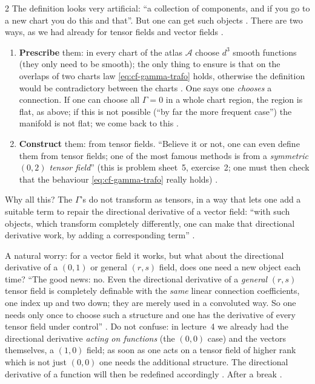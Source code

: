 \begin{paracol}{2}
The definition looks very artificial: ``a collection of components, and if you go to a new chart you do this and that''. But one
can get such objects . There are two ways, as we had already for tensor fields and vector fields
.
\begin{enumerate}
  \item \textbf{Prescribe} them: in every chart of the atlas $\mathcal A$ choose $d^3$ smooth functions (they only need to be
        smooth); the only thing to ensure is that on the overlaps of two charts law \eqref{eq:cf-gamma-trafo} holds, otherwise the definition would
        be contradictory between the charts . One says one \emph{chooses} a connection. If one can choose all
        $\Gamma=0$ in a whole chart region, the region is flat, as above; if this is not possible (``by far the more frequent
        case'') the manifold is not flat; we come back to this .
  \item \textbf{Construct} them: from tensor fields. ``Believe it or not, one can even define them from tensor fields; one of the
        most famous methods is from a \emph{symmetric $(0,2)$ tensor field}'' (this is problem sheet~5, exercise~2; one must then
        check that the behaviour \eqref{eq:cf-gamma-trafo} really holds) .
\end{enumerate}
\begin{aside}
Why all this? The $\Gamma$'s do not transform as tensors, in a way that lets one add a suitable term to repair the directional
derivative of a vector field: ``with such objects, which transform completely differently, one can make that directional
derivative work, by adding a corresponding term'' .
\end{aside}
A natural worry: for a vector field it works, but what about the directional derivative of a $(0,1)$ or general $(r,s)$ field, does one
need a new object each time? ``The good news: no. Even the directional derivative of a \emph{general} $(r,s)$ tensor field is
completely definable with the \emph{same} linear connection coefficients, one index up and two down; they are merely used in a
convoluted way. So one needs only once to choose such a structure and one has the derivative of every tensor field under control''
.
Do not confuse: in lecture~4 we already had the directional derivative \emph{acting on functions} (the $(0,0)$ case) and the vectors
themselves, a $(1,0)$ field; as soon as one acts on a tensor field of higher rank which is not just $(0,0)$ one needs the additional
structure. The directional derivative of a function will then be redefined accordingly .
After a break .


\end{paracol}
